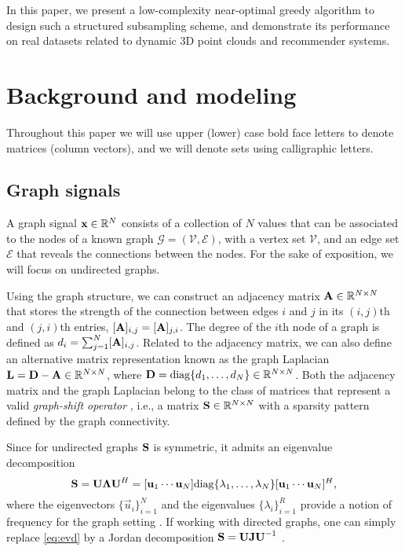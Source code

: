 \documentclass{article}
\begin{document}
In this paper, we present a low-complexity near-optimal greedy algorithm to design such a structured subsampling scheme, and demonstrate its performance on real datasets related to dynamic 3D point clouds and recommender systems.

\section{Background and modeling}

Throughout this paper we will use upper (lower) case bold face letters to denote matrices (column vectors), and we will denote sets using calligraphic letters.

\subsection{Graph signals}

A graph signal $\boldsymbol{\mathrm{x}}\in\mathbb{R}^{N}$ consists of a collection of $N$ values that can be associated to the nodes of a known graph $\mathcal{G}=(\mathcal{V},\mathcal{E})$, with a vertex set $\mathcal{V}$, and an edge set $\mathcal{E}$ that reveals the connections between the nodes. For the sake of exposition, we will focus on undirected graphs.

Using the graph structure, we can construct an adjacency matrix $\boldsymbol{\mathrm{A}}\in\mathbb{R}^{N\times N}$ that stores the strength of the connection between edges $i$ and $j$ in its $(i,j)$th and $(j,i)$th entries, $[\boldsymbol{\mathrm{A}}]_{i,j}=[\boldsymbol{\mathrm{A}}]_{j,i}$. The degree of the $i$th node of a graph is defined as $d_i=\sum_{j=1}^N [\boldsymbol{\mathrm{A}}]_{i,j}$. Related to the adjacency matrix, we can also define an alternative matrix representation known as the graph Laplacian $\boldsymbol{\mathrm{L}}=\boldsymbol{\mathrm{D}}-\boldsymbol{\mathrm{A}}\in\mathbb{R}^{N\times N}$, where $\boldsymbol{\mathrm{D}}=\mathrm{diag}\{d_1,\dots,d_N\}\in\mathbb{R}^{N\times N}$. Both the adjacency matrix and the graph Laplacian belong to the class of matrices that represent a valid \emph{graph-shift operator} \cite{gsp}, i.e., a matrix $\boldsymbol{\mathrm{S}}\in\mathbb{R}^{N\times N}$ with a sparsity pattern defined by the graph connectivity. 

Since for undirected graphs $\boldsymbol{\mathrm{S}}$ is symmetric, it admits an eigenvalue decomposition
\begin{equation}
	\boldsymbol{\mathrm{S}}=\boldsymbol{\mathrm{U}}\boldsymbol{\mathrm{\Lambda}}\boldsymbol{\mathrm{U}}^H=[\boldsymbol{\mathrm{u}}_1\cdots\boldsymbol{\mathrm{u}}_N]\mathrm{diag}\{\lambda_1,\dots,\lambda_N\}[\boldsymbol{\mathrm{u}}_1\cdots\boldsymbol{\mathrm{u}}_N]^H,\label{eq:evd}
\end{equation}
where the eigenvectors $\{\vec{u}_i\}_{i=1}^N$ and the eigenvalues $\{\lambda_i\}_{i=1}^R$ provide a notion of frequency for the graph setting \cite{gsp}. If working with directed graphs, one can simply replace \eqref{eq:evd} by a Jordan decomposition $\boldsymbol{\mathrm{S}}=\boldsymbol{\mathrm{U}}\boldsymbol{\mathrm{J}}\boldsymbol{\mathrm{U}}^{-1}$ \cite{jordan}.
\end{document}
